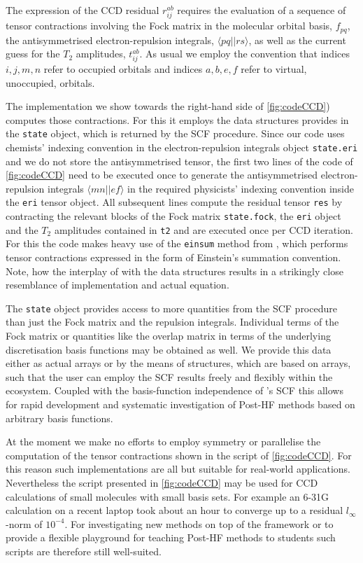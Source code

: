 The expression of the CCD residual $r_{ij}^{ab}$
requires the evaluation of a sequence of tensor contractions
involving the Fock matrix in the molecular orbital basis, $f_{pq}$,
the antisymmetrised electron-repulsion integrals, $\langle pq||rs \rangle$,
as well as the current guess for the $T_2$ amplitudes, $t_{ij}^{ab}$.
As usual we employ the convention that indices $i,j,m,n$ refer
to occupied orbitals and indices $a,b,e,f$
refer to virtual, \ie unoccupied, orbitals.

The \python implementation we show towards the right-hand side
of \fig \ref{fig:codeCCD})
computes those contractions.
For this it employs the data structures \molsturm provides
in the \texttt{state} object, which is returned by the SCF procedure.
Since our code uses chemists' indexing convention
in the electron-repulsion integrals object \texttt{state.eri}
and we do not store the antisymmetrised tensor,
the first two lines of the code of \fig \ref{fig:codeCCD}
need to be executed once to generate
the antisymmetrised electron-repulsion integrals $\langle mn||ef \rangle$
in the required physicists' indexing convention
inside the \texttt{eri} tensor object.
All subsequent lines compute the residual tensor \texttt{res}
by contracting the relevant blocks of the Fock matrix \texttt{state.fock},
the \texttt{eri} object and the $T_2$ amplitudes contained in \texttt{t2}
and are executed once per CCD iteration.
For this the code makes heavy use of the \texttt{einsum} method from \numpy,
which performs tensor contractions
expressed in the form of Einstein's summation convention.
Note, how the interplay of \numpy
with the data structures \molsturm results in a
strikingly close resemblance of implementation and actual equation.

The \texttt{state} object
provides access to more quantities from the SCF procedure
than just the Fock matrix and the repulsion integrals.
Individual terms of the Fock matrix or
quantities like the overlap matrix in terms of the underlying
discretisation basis functions may be obtained as well.
We provide this data either as actual \numpy arrays
or by the means of structures,
which are based on \numpy arrays,
such that the user can employ the SCF results freely and flexibly
within the \python ecosystem.
Coupled with the basis-function independence of \molsturm's
SCF this allows for rapid development and systematic investigation
of Post-HF methods based on arbitrary basis functions.

At the moment we make no efforts to employ symmetry or parallelise
the computation of the tensor contractions
shown in the script of \fig \ref{fig:codeCCD}.
For this reason such implementations are all but suitable for
real-world applications.
Nevertheless the script presented in \fig \ref{fig:codeCCD}
may be used for CCD calculations of small molecules with small basis sets.
For example an  6-31G~\cite{Hehre1972} calculation on a recent laptop took
about an hour to converge up to a residual $l_\infty$-norm of $10^{-4}$.
For investigating new methods on top of the \molsturm framework
or to provide a flexible playground for teaching Post-HF methods to students
such scripts are therefore still well-suited.

